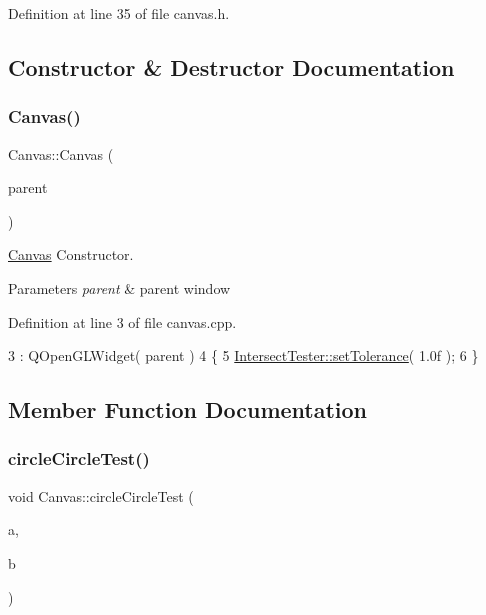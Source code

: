 Definition at line 35 of file canvas.\+h.



\subsection{Constructor \& Destructor Documentation}
\mbox{\label{class_canvas_a8e5bf913d99dcf0511aaa5fd8c294cde}} 
\subsubsection{\texorpdfstring{Canvas()}{Canvas()}}
{\footnotesize\ttfamily Canvas\+::\+Canvas (\begin{DoxyParamCaption}\item[{Q\+Widget $\ast$}]{parent }\end{DoxyParamCaption})}



\hyperlink{class_canvas}{Canvas} Constructor. 


\begin{DoxyParams}{Parameters}
{\em parent} & parent window \\
\hline
\end{DoxyParams}


Definition at line 3 of file canvas.\+cpp.


\begin{DoxyCode}
3                                 : QOpenGLWidget( parent )
4 \{
5     \hyperlink{class_intersect_tester_ac837c3469e328c8bb47d08742c304c9a}{IntersectTester::setTolerance}( 1.0f );
6 \}
\end{DoxyCode}


\subsection{Member Function Documentation}
\mbox{\label{class_canvas_afefa6855ba41959bd86059c3a243b837}} 
\subsubsection{\texorpdfstring{circle\+Circle\+Test()}{circleCircleTest()}}
{\footnotesize\ttfamily void Canvas\+::circle\+Circle\+Test (\begin{DoxyParamCaption}\item[{\hyperlink{class_circle}{Circle}}]{a,  }\item[{\hyperlink{class_circle}{Circle}}]{b }\end{DoxyParamCaption})\hspace{0.3cm}{\ttfamily [private]}}



